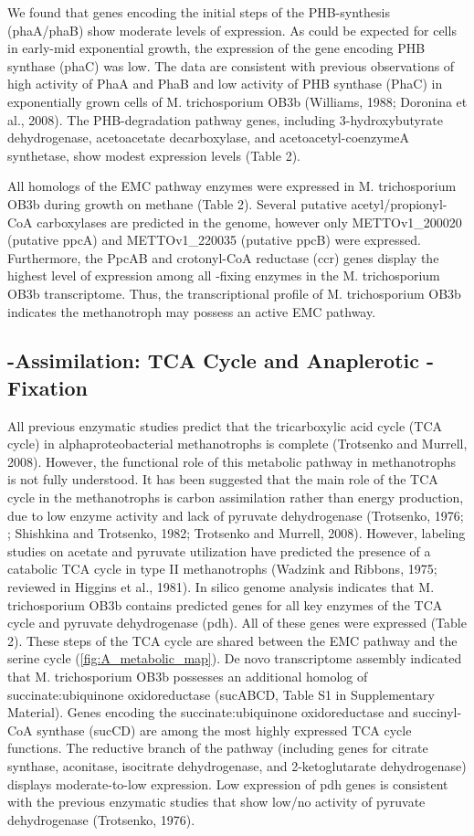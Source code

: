We found that genes encoding the initial steps of the PHB-synthesis (phaA/phaB) show moderate levels of expression.
As could be expected for cells in early-mid exponential growth, the expression of the gene encoding PHB synthase (phaC) was low.
The data are consistent with previous observations of high activity of PhaA and PhaB and low activity of PHB synthase (PhaC) in exponentially grown cells of M. trichosporium OB3b (Williams, 1988; Doronina et al., 2008).
The PHB-degradation pathway genes, including 3-hydroxybutyrate dehydrogenase, acetoacetate decarboxylase, and acetoacetyl-coenzymeA synthetase, show modest expression levels (Table 2).

All homologs of the EMC pathway enzymes were expressed in M. trichosporium OB3b during growth on methane (Table 2).
Several putative acetyl/propionyl-CoA carboxylases are predicted in the genome, however only METTOv1\_200020 (putative ppcA) and METTOv1\_220035 (putative ppcB) were expressed.
Furthermore, the PpcAB and crotonyl-CoA reductase (ccr) genes display the highest level of expression among all -fixing enzymes in the M. trichosporium OB3b transcriptome.
Thus, the transcriptional profile of M. trichosporium OB3b indicates the methanotroph may possess an active EMC pathway.

\subsection{-Assimilation: TCA Cycle and Anaplerotic -Fixation}
All previous enzymatic studies predict that the tricarboxylic acid cycle (TCA cycle) in alphaproteobacterial methanotrophs is complete (Trotsenko and Murrell, 2008).
However, the functional role of this metabolic pathway in methanotrophs is not fully understood.
It has been suggested that the main role of the TCA cycle in the methanotrophs is carbon assimilation rather than energy production, due to low enzyme activity and lack of pyruvate dehydrogenase (Trotsenko, 1976; \cite{anthony1982}; Shishkina and Trotsenko, 1982; Trotsenko and Murrell, 2008).
However, labeling studies on acetate and pyruvate utilization have predicted the presence of a catabolic TCA cycle in type II methanotrophs (Wadzink and Ribbons, 1975; reviewed in Higgins et al., 1981).
In silico genome analysis indicates that M. trichosporium OB3b contains predicted genes for all key enzymes of the TCA cycle and pyruvate dehydrogenase (pdh).
All of these genes were expressed (Table 2).
These steps of the TCA cycle are shared between the EMC pathway and the serine cycle (\ref{fig:A_metabolic_map}).
De novo transcriptome assembly indicated that M. trichosporium OB3b possesses an additional homolog of succinate:ubiquinone oxidoreductase (sucABCD, Table S1 in Supplementary Material).
Genes encoding the succinate:ubiquinone oxidoreductase and succinyl-CoA synthase (sucCD) are among the most highly expressed TCA cycle functions.
The reductive branch of the pathway (including genes for citrate synthase, aconitase, isocitrate dehydrogenase, and 2-ketoglutarate dehydrogenase) displays moderate-to-low expression.
Low expression of pdh genes is consistent with the previous enzymatic studies that show low/no activity of pyruvate dehydrogenase (Trotsenko, 1976).

